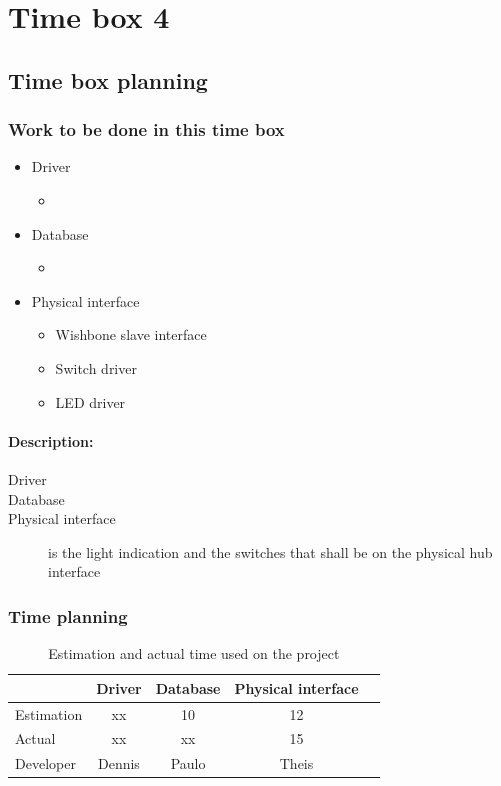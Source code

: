 \section{Time box 4}
\listoftodos
\subsection{Time box planning}
\begin{figure}[H]
	\begin{centering}
	\end{centering}
\end{figure}
\subsubsection{Work to be done in this time box}
\begin{itemize}
	\item Driver
	\begin{itemize}
		\item {}
	\end{itemize}
	\item Database
	\begin{itemize}
		\item {}
	\end{itemize}
	\item Physical interface
	\begin{itemize}
		\item Wishbone slave interface
		\item Switch driver
		\item LED driver
	\end{itemize}
\end{itemize}
\paragraph{Description:}
\begin{description}
	\item[Driver] 
	\item[Database] 
	\item[Physical interface] is the light indication and the switches that shall be on the physical hub interface
\end{description}
\subsubsection{Time planning}
\begin{table}[H]
\centering
	\begin{tabular}{|l|c|c|c|c|}
		\hline
		~			& Driver		& Database	& Physical interface\\ \hline
		Estimation	& xx			& 10		& 12				\\
		Actual		& xx			& xx		& 15				\\
		Developer	& Dennis		& Paulo		& Theis				\\
		\hline
	\end{tabular}
	\caption{Estimation and actual time used on the project}
\end{table}
